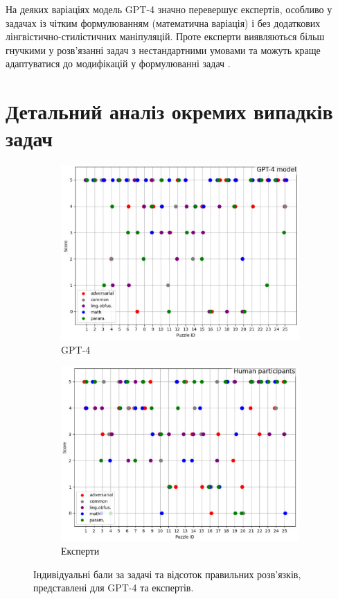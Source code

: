 На деяких варіаціях модель GPT-4 значно перевершує експертів, особливо у задачах із чітким формулюванням (математична варіація) і без додаткових лінгвістично-стилістичних маніпуляцій. Проте експерти виявляються більш гнучкими у розв’язанні задач з нестандартними умовами та можуть краще адаптуватися до модифікацій у формулюванні задач \cite{nikolaiev2024can}.

\section{Детальний аналіз окремих випадків задач}

\begin{figure}
    \centering
    \begin{subfigure}{\linewidth}
        \centering
        \includegraphics[width=0.75\linewidth]{data/Image-GPT-4.pdf}
        \caption{GPT-4}
        \label{fig:subimage_gpt4}
    \end{subfigure}
    \begin{subfigure}{\linewidth}
        \centering
        \includegraphics[width=0.75\linewidth]{data/Image-Humans.pdf}
        \caption{Експерти}
        \label{fig:subimage_humans}
    \end{subfigure}
    \caption{Індивідуальні бали за задачі та відсоток правильних розв’язків, представлені для GPT-4 та експертів.}
    \label{fig:humans_v_models_problems}
\end{figure}

